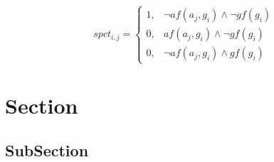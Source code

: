 \documentclass[a4paper]{article}
\begin{document}
\begin{equation}
spct_{i,j} =
\begin{cases}
1, & \text{$\neg af(a_j,g_i) \wedge \neg gf(g_i)$}\\
0, & \text{$af(a_j,g_i) \wedge \neg gf(g_i)$}\\
0, & \text{$\neg af(a_j,g_i) \wedge gf(g_i)$}
\end{cases}
\end{equation}

\section{Section}

\subsection{SubSection}
\end{document}
